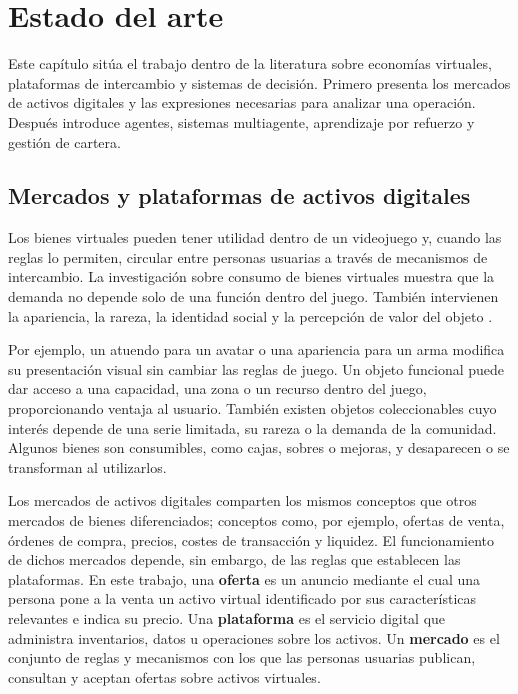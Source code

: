 \chapter{Estado del arte}

\noindent Este capítulo sitúa el trabajo dentro de la literatura sobre economías virtuales, plataformas de intercambio y sistemas de decisión. Primero presenta los mercados de activos digitales y las expresiones necesarias para analizar una operación. Después introduce agentes, sistemas multiagente, aprendizaje por refuerzo y gestión de cartera.

\section{Mercados y plataformas de activos digitales}

Los bienes virtuales pueden tener utilidad dentro de un videojuego y, cuando las reglas lo permiten, circular entre personas usuarias a través de mecanismos de intercambio. La investigación sobre consumo de bienes virtuales muestra que la demanda no depende solo de una función dentro del juego. También intervienen la apariencia, la rareza, la identidad social y la percepción de valor del objeto \cite{lehdonvirta2009virtual,guo2009virtual}.

Por ejemplo, un atuendo para un avatar o una apariencia para un arma modifica su presentación visual sin cambiar las reglas de juego. Un objeto funcional puede dar acceso a una capacidad, una zona o un recurso dentro del juego, proporcionando ventaja al usuario. También existen objetos coleccionables cuyo interés depende de una serie limitada, su rareza o la demanda de la comunidad. Algunos bienes son consumibles, como cajas, sobres o mejoras, y desaparecen o se transforman al utilizarlos.

Los mercados de activos digitales comparten los mismos conceptos que otros mercados de bienes diferenciados; conceptos como, por ejemplo, ofertas de venta, órdenes de compra, precios, costes de transacción y liquidez. El funcionamiento de dichos mercados depende, sin embargo, de las reglas que establecen las plataformas. En este trabajo, una \textbf{oferta} es un anuncio mediante el cual una persona pone a la venta un activo virtual identificado por sus características relevantes e indica su precio. Una \textbf{plataforma} es el servicio digital que administra inventarios, datos u operaciones sobre los activos. Un \textbf{mercado} es el conjunto de reglas y mecanismos con los que las personas usuarias publican, consultan y aceptan ofertas sobre activos virtuales.

